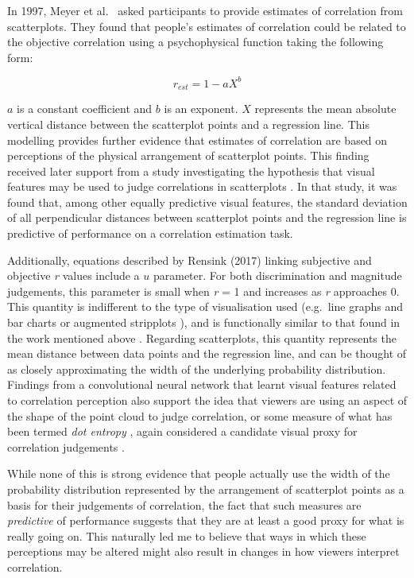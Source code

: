 \documentclass[../main.tex]{subfiles}
\begin{document}
In 1997, Meyer et al.~\cite{meyer_1997} asked participants to provide
estimates of correlation from scatterplots. They found that people's
estimates of correlation could be related to the objective correlation
using a psychophysical function taking the following form:

\begin{equation}
  r_{est} = 1 - aX^b
\end{equation}

\(a\) is a constant coefficient and \(b\) is an exponent. \(X\)
represents the mean absolute vertical distance between the scatterplot
points and a regression line. This modelling provides further evidence
that estimates of correlation are based on perceptions of the physical
arrangement of scatterplot points. This finding received later support
from a study investigating the hypothesis that visual features may be
used to judge correlations in scatterplots \cite{yang_2019}. In that
study, it was found that, among other equally predictive visual
features, the standard deviation of all perpendicular distances between
scatterplot points and the regression line is predictive of performance
on a correlation estimation task.

Additionally, equations described by Rensink (2017) \cite{rensink_2017}
linking subjective and objective \emph{r} values include a \(u\)
parameter. For both discrimination and magnitude judgements, this
parameter is small when \emph{r} = 1 and increases as \emph{r}
approaches 0. This quantity is indifferent to the type of visualisation
used (e.g.~line graphs and bar charts \cite{harrison_2014} or augmented
stripplots \cite{rensink_2017}), and is functionally similar to that
found in the work mentioned above
\cite{cleveland_1982, meyer_1997, yang_2019}. Regarding scatterplots,
this quantity represents the mean distance between data points and the
regression line, and can be thought of as closely approximating the
width of the underlying probability distribution. Findings from a
convolutional neural network that learnt visual features related to
correlation perception also support the idea that viewers are using an
aspect of the shape of the point cloud to judge correlation, or some
measure of what has been termed \emph{dot entropy} \cite{yang_2023},
again considered a candidate visual proxy for correlation judgements
\cite{rensink_2017, rensink_2022}.

While none of this is strong evidence that people actually use the width
of the probability distribution represented by the arrangement of
scatterplot points as a basis for their judgements of correlation, the
fact that such measures are \emph{predictive} of performance suggests
that they are at least a good proxy for what is really going on. This
naturally led me to believe that ways in which these perceptions may be
altered might also result in changes in how viewers interpret
correlation.
\end{document}
